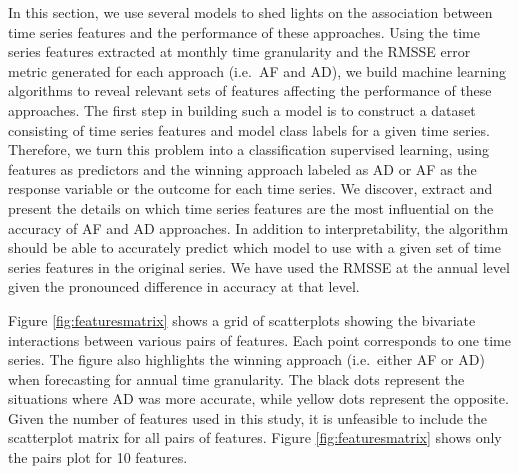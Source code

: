 \documentclass[preprint, 3p,
authoryear]{elsarticle} %
\begin{document}
In this section, we use several models to shed lights on the association
between time series features and the performance of these approaches.
Using the time series features extracted at monthly time granularity and
the RMSSE error metric generated for each approach (i.e.~AF and AD), we
build machine learning algorithms to reveal relevant sets of features
affecting the performance of these approaches. The first step in
building such a model is to construct a dataset consisting of time
series features and model class labels for a given time series.
Therefore, we turn this problem into a classification supervised
learning, using features as predictors and the winning approach labeled
as AD or AF as the response variable or the outcome for each time
series. We discover, extract and present the details on which time
series features are the most influential on the accuracy of AF and AD
approaches. In addition to interpretability, the algorithm should be
able to accurately predict which model to use with a given set of time
series features in the original series. We have used the RMSSE at the
annual level given the pronounced difference in accuracy at that level.

Figure \ref{fig:featuresmatrix} shows a grid of scatterplots showing the
bivariate interactions between various pairs of features. Each point
corresponds to one time series. The figure also highlights the winning
approach (i.e.~either AF or AD) when forecasting for annual time
granularity. The black dots represent the situations where AD was more
accurate, while yellow dots represent the opposite. Given the number of
features used in this study, it is unfeasible to include the scatterplot
matrix for all pairs of features. Figure \ref{fig:featuresmatrix} shows
only the pairs plot for 10 features.
\end{document}
